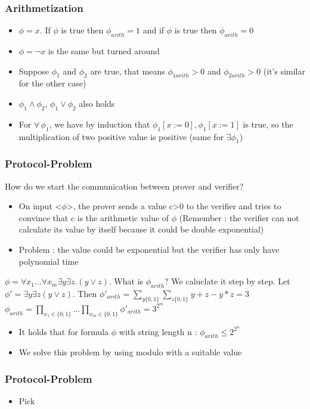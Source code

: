 \documentclass[hyperref={pdfpagelabels=false},t,10pt]{beamer}
\begin{document}
\begin{frame}
  \frametitle{Arithmetization}
  \begin{itemize}
    \item $\phi = x$. If $\phi$ is true then $\phi_{arith} = 1$ and if $\phi $ is true then $\phi_{arith} = 0$
    \item $\phi = \neg x$ is the same but turned around \pause
    \item Suppose $\phi_1$ and $\phi_2$ are true, that means $\phi_{1arith} > 0$ and $\phi_{2arith} > 0$ \newline(it's similar for the other case)\pause
    \item $\phi_1 \land \phi_2$, $\phi_1 \lor \phi_2$ also holds
    \item For $\forall \, \phi_1$, we have by induction that $\phi_1[x := 0], \phi_1[x := 1]$ is true, so the multiplication of two positive value is positive (same for $\exists \phi_1$)
  \end{itemize}
\end{frame}

\begin{frame}
  \frametitle{Protocol-Problem}
  How do we start the communication between prover and verifier? \pause

  \begin{itemize}
    \item On input <$\phi$>, the prover sends a value c>0 to the verifier and tries to convince that c is the arithmetic value of $\phi$ \newline (Remember : the verifier can not calculate its value by itself because it could be double exponential) \pause
    \item Problem : the value could be exponential but the verifier has only have polynomial time \pause
  \end{itemize}

  $\phi = \forall x_1 ... \forall x_m \exists y \exists z. (y \lor z)$. What is $\phi_{arith}$? We caluclate it step by step. \pause
  Let $\phi' = \exists y \exists z (y \lor z)$. Then $\phi'_{arith} = \sum_{y \{0,1\}}^{} \sum_{z \{0,1\}^{}} y + z - y*z = 3$ \pause
  $\phi_{arith} = \prod_{x_1 \in \{0,1\}}^{}... \prod_{x_m \in \{0,1\}}^{} \phi'_{arith} = 3^{2^{m}}$ \newline
  \begin{itemize}
    \item It holds that for formula $\phi$ with string length n : $\phi_{arith} \leq 2^{2^{n}}$
    \item  We solve this problem by using modulo with a suitable value
  \end{itemize}
\end{frame}

\begin{frame}
  \frametitle{Protocol-Problem}
  \begin{itemize}
    \item Pick 
  \end{itemize}
\end{frame}
\end{document}
